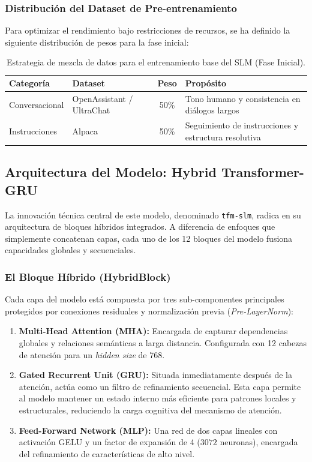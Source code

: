 \subsubsection{Distribución del Dataset de Pre-entrenamiento}
Para optimizar el rendimiento bajo restricciones de recursos, se ha definido la siguiente distribución de pesos para la fase inicial:

\begin{table}[H]
\centering
\begin{tabularx}{\textwidth}{|X|X|c|X|}
\hline
\textbf{Categoría} & \textbf{Dataset} & \textbf{Peso} & \textbf{Propósito} \\ \hline
Conversacional & OpenAssistant / UltraChat & 50\% & Tono humano y consistencia en diálogos largos \\ \hline
Instrucciones & Alpaca & 50\% & Seguimiento de instrucciones y estructura resolutiva \\ \hline
\end{tabularx}
\caption{Estrategia de mezcla de datos para el entrenamiento base del SLM (Fase Inicial).}
\end{table}

\subsection{Arquitectura del Modelo: Hybrid Transformer-GRU}
La innovación técnica central de este modelo, denominado \texttt{tfm-slm}, radica en su arquitectura de bloques híbridos integrados. A diferencia de enfoques que simplemente concatenan capas, cada uno de los 12 bloques del modelo fusiona capacidades globales y secuenciales.

\subsubsection{El Bloque Híbrido (HybridBlock)}
Cada capa del modelo está compuesta por tres sub-componentes principales protegidos por conexiones residuales y normalización previa (\textit{Pre-LayerNorm}):
\begin{enumerate}
    \item \textbf{Multi-Head Attention (MHA):} Encargada de capturar dependencias globales y relaciones semánticas a larga distancia. Configurada con 12 cabezas de atención para un \textit{hidden size} de 768.
    \item \textbf{Gated Recurrent Unit (GRU):} Situada inmediatamente después de la atención, actúa como un filtro de refinamiento secuencial. Esta capa permite al modelo mantener un estado interno más eficiente para patrones locales y estructurales, reduciendo la carga cognitiva del mecanismo de atención.
    \item \textbf{Feed-Forward Network (MLP):} Una red de dos capas lineales con activación GELU y un factor de expansión de 4 ($3072$ neuronas), encargada del refinamiento de características de alto nivel.
\end{enumerate}

